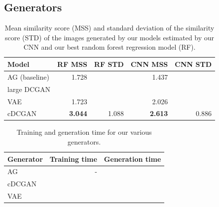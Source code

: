 \documentclass[10pt,conference,compsocconf]{IEEEtran}
\newcommand\TODO[1]{\textcolor{red}{#1}} %
\begin{document}
\subsection{Generators}

\begin{table}\centering
\begin{tabular}{lrr|rr}
\toprule
Model & RF MSS & RF STD & CNN MSS & CNN STD \\
\midrule
AG (baseline)  & 1.728 & & 1.437 & \\
large DCGAN & & & & \\
VAE & 1.723 & & 2.026 & \\
cDCGAN & \textbf{3.044} & 1.088 & \textbf{2.613} & 0.886 \\
\bottomrule
\end{tabular}
\caption{Mean similarity score (MSS) and standard deviation of the similarity score (STD) of the images generated by our models estimated by our CNN and our best random forest regression model (RF).}\label{tab:gen_MSS}
\end{table}


  \label{tab:gen_MSS}




\begin{table}[htbp]
  \centering
  \begin{tabular}[c]{|l||r|r|}
    \hline
    Generator   & Training time & Generation time \\
    \hline
    AG          &  -            &       \\
    cDCGAN      &               &       \\
    VAE         &               &       \\
    \hline
  \end{tabular}
  \caption{Training and generation time for our various generators.}
  \label{tab:gen_time}
\end{table}
\end{document}
